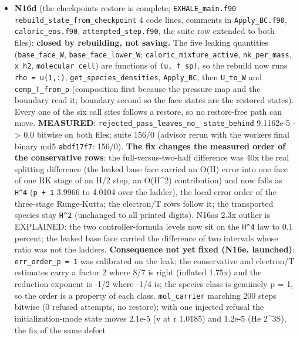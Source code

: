 \documentclass[english,a4paper]{my_memo}
\begin{document}
\begin{itemize}
  exception (read only after their write within a sweep).
\item
  \textbf{N16d} (the checkpoint\textquotesingle s restore is complete; \texttt{EXHALE\_main.f90}
  \texttt{rebuild\_state\_from\_checkpoint} 4 code lines, comments in \texttt{Apply\_BC.f90},
  \texttt{caloric\_eos.f90}, \texttt{attempted\_step.f90}, the suite row extended to both
  files): \textbf{closed by rebuilding, not saving.} The five leaking quantities
  (\texttt{base\_face\_W}, \texttt{base\_face\_lower\_W}; \texttt{caloric\_mixture\_active},
  \texttt{nk\_per\_mass}, \texttt{x\_h2}, \texttt{molecular\_cell}) are functions of \texttt{(u,\ f\_sp)}, so
  the rebuild now runs \texttt{rho\ =\ u(1,:)}, \texttt{get\_species\_densities}, \texttt{Apply\_BC},
  then \texttt{U\_to\_W} and \texttt{comp\_T\_from\_p} (composition first because the pressure
  map and the boundary read it; boundary second so the face states are the
  restored state\textquotesingle s). Every one of the six call sites follows a restore, so
  no restore-free path can move. \textbf{MEASURED}: \texttt{rejected\_pass\_leaves\_no\_\ state\_behind} 9.1162e-5 -\textgreater{} 0.0 bitwise on both files; suite 156/0
  (advisor rerun with the worker\textquotesingle s final binary md5 \texttt{abdf17f7}: 156/0).
  \textbf{The fix changes the measured order of the conservative rows}: the
  full-versus-two-half difference was 40x the real splitting difference
  (the leaked base face carried an O(H) error into one face of one RK
  stage of an H/2 step, an O(H\^{}2) contribution) and now falls as \texttt{H\^{}4}
  (\texttt{p\ +\ 1} 3.9966 to 4.0104 over the ladder), the local-error order of the
  three-stage Runge-Kutta; the electron/T rows follow it; the transported
  species stay \texttt{H\^{}2} (unchanged to all printed digits). N16a\textquotesingle s 2.3x outlier
  is EXPLAINED: the two controller-formula levels now sit on the \texttt{H\^{}4} law
  to 0.1 percent; the leaked base face carried the difference of two
  intervals whose ratio was not the ladder\textquotesingle s. \textbf{Consequence not yet fixed
  (N16e, launched)}: \texttt{err\_order\_p\ =\ 1} was calibrated on the leak; the
  conservative and electron/T estimates carry a factor 2 where 8/7 is
  right (inflated 1.75x) and the reduction exponent is -1/2 where -1/4 is;
  the species class is genuinely p = 1, so the order is a property of each
  class. \texttt{mol\_carrier} marching 200 steps bitwise (0 refused attempts, no
  restore); with one injected refusal the initialization-mode state moves
  2.1e-5 (v at r 1.0185) and 1.2e-5 (He 2\^{}3S), the fix of the same defect

\end{itemize}
\end{document}
